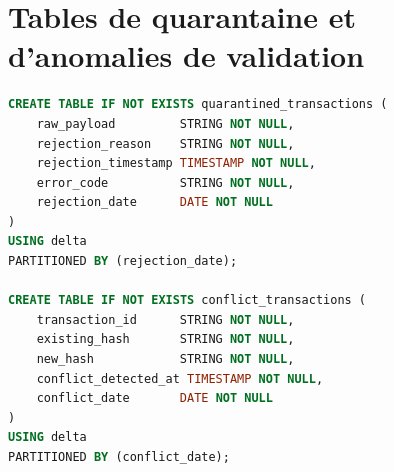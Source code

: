 \section{Tables de quarantaine et d'anomalies de validation}

\begin{lstlisting}[language=SQL, caption={Définition DDL des tables de quarantaine et conflits}, label={lst:ddl_quarantine}]
CREATE TABLE IF NOT EXISTS quarantined_transactions (
    raw_payload         STRING NOT NULL,
    rejection_reason    STRING NOT NULL,
    rejection_timestamp TIMESTAMP NOT NULL,
    error_code          STRING NOT NULL,
    rejection_date      DATE NOT NULL
)
USING delta
PARTITIONED BY (rejection_date);

CREATE TABLE IF NOT EXISTS conflict_transactions (
    transaction_id      STRING NOT NULL,
    existing_hash       STRING NOT NULL,
    new_hash            STRING NOT NULL,
    conflict_detected_at TIMESTAMP NOT NULL,
    conflict_date       DATE NOT NULL
)
USING delta
PARTITIONED BY (conflict_date);
\end{lstlisting}

